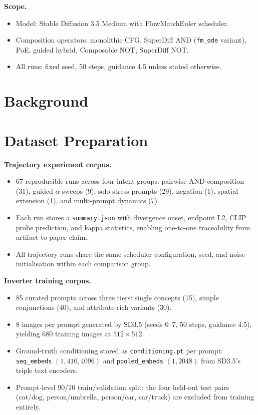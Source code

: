 \documentclass[runningheads]{llncs}
\begin{document}
\textbf{Scope.}
\begin{itemize}
  \item Model: Stable Diffusion 3.5 Medium with FlowMatchEuler scheduler.
  \item Composition operators: monolithic CFG, SuperDiff AND (\texttt{fm\_ode}
    variant), PoE, guided hybrid, Composable NOT, SuperDiff NOT.
  \item All runs: fixed seed, 50 steps, guidance 4.5 unless stated otherwise.
\end{itemize}

\section{Background}


\section{Dataset Preparation}

\textbf{Trajectory experiment corpus.}
\begin{itemize}
  \item 67 reproducible runs across four intent groups: pairwise AND
    composition (31), guided $\alpha$ sweeps (9), solo stress prompts (29),
    negation (1), spatial extension (1), and multi-prompt dynamics (7).
  \item Each run stores a \texttt{summary.json} with divergence onset,
    endpoint L2, CLIP probe prediction, and kappa statistics, enabling
    one-to-one traceability from artifact to paper claim.
  \item All trajectory runs share the same scheduler configuration, seed,
    and noise initialisation within each comparison group.
\end{itemize}

\textbf{Inverter training corpus.}
\begin{itemize}
  \item 85 curated prompts across three tiers: single concepts (15),
    simple conjunctions (40), and attribute-rich variants (30).
  \item 8 images per prompt generated by SD3.5 (seeds 0--7, 50 steps,
    guidance 4.5), yielding 680 training images at $512\times512$.
  \item Ground-truth conditioning stored as \texttt{conditioning.pt} per
    prompt: \texttt{seq\_embeds} $(1, 410, 4096)$ and
    \texttt{pooled\_embeds} $(1, 2048)$ from SD3.5's triple text encoders.
  \item Prompt-level 90/10 train/validation split; the four held-out test
    pairs (cat/dog, person/umbrella, person/car, car/truck) are excluded
    from training entirely.
\end{itemize}
\end{document}
